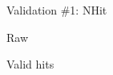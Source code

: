 \documentclass[xcolor=table]{beamer}
\begin{document}
\begin{frame}{Validation \#1: NHit}
\begin{minipage}{0.5\textwidth}
\noindent{}
\center Raw
\end{minipage}%
\begin{minipage}{0.5\textwidth}
\noindent{}
\noindent{}
\center Valid hits
\end{minipage}
\end{frame}
\end{document}
